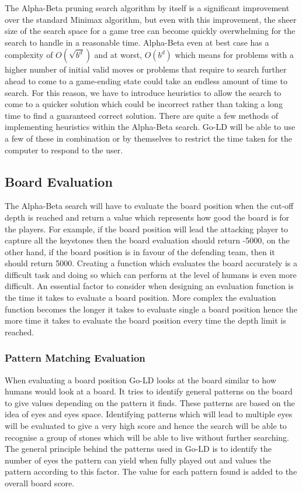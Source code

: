 \documentclass{l4proj}
\begin{document}
The Alpha-Beta pruning search algorithm by itself is a significant improvement over the standard Minimax algorithm, but even with this improvement, the sheer size of the search space for a game tree can become quickly overwhelming for the search to handle in a reasonable time. Alpha-Beta even at best case has a complexity of $O(\sqrt{b^d})$ and at worst, $O(b^d)$  which means for problems with a higher number of initial valid moves or problems that require to search further ahead to come to a game-ending state could take an endless amount of time to search. For this reason, we have to introduce heuristics to allow the search to come to a quicker solution which could be incorrect rather than taking a long time to find a guaranteed correct solution. There are quite a few methods of implementing heuristics within the Alpha-Beta search. Go-LD will be able to use a few of these in combination or by themselves to restrict the time taken for the computer to respond to the user.

\subsection{Board Evaluation}
The Alpha-Beta search will have to evaluate the board position when the cut-off depth is reached and return a value which represents how good the board is for the players. For example, if the board position will lead the attacking player to capture all the keystones then the board evaluation should return -5000,   on the other hand, if the board position is in favour of the defending team, then it should return 5000. Creating a function which evaluates the board accurately is a difficult task and doing so which can perform at the level of humans is even more difficult. An essential factor to consider when designing an evaluation function is the time it takes to evaluate a board position. More complex the evaluation function becomes the longer it takes to evaluate single a board position hence the more time it takes to evaluate the board position every time the depth limit is reached.

\subsubsection{Pattern Matching Evaluation}

When evaluating a board position Go-LD looks at the board similar to how humans would look at a board. It tries to identify general patterns on the board to give values depending on the pattern it finds. These patterns are based on the idea of eyes and eyes space. Identifying patterns which will lead to multiple eyes will be evaluated to give a very high score and hence the search will be able to recognise a group of stones which will be able to live without further searching. The general principle behind the patterns used in Go-LD is to identify the number of eyes the pattern can yield when fully played out and values the pattern according to this factor. The value for each pattern found is added to the overall board score.
\end{document}
